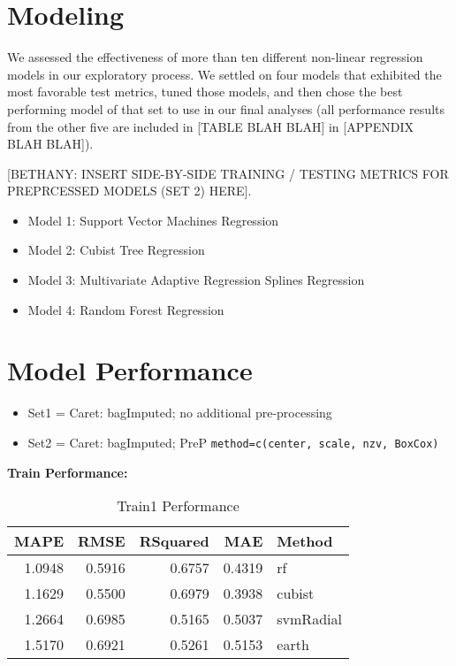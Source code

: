\documentclass[]{report}
\providecommand{\tightlist}{%
  \setlength{\itemsep}{0pt}\setlength{\parskip}{0pt}}
\begin{document}
\hypertarget{modeling}{%
\chapter{Modeling}\label{modeling}}

We assessed the effectiveness of more than ten different non-linear
regression models in our exploratory process. We settled on four models
that exhibited the most favorable test metrics, tuned those models, and
then chose the best performing model of that set to use in our final
analyses (all performance results from the other five are included in
{[}TABLE BLAH BLAH{]} in {[}APPENDIX BLAH BLAH{]}).

{[}BETHANY: INSERT SIDE-BY-SIDE TRAINING / TESTING METRICS FOR
PREPRCESSED MODELS (SET 2) HERE{]}.

\begin{itemize}
\tightlist
\item
  Model 1: Support Vector Machines Regression
\item
  Model 2: Cubist Tree Regression
\item
  Model 3: Multivariate Adaptive Regression Splines Regression
\item
  Model 4: Random Forest Regression
\end{itemize}

\hypertarget{model-performance}{%
\chapter{Model Performance}\label{model-performance}}

\begin{itemize}
\tightlist
\item
  Set1 = Caret: bagImputed; no additional pre-processing\\
\item
  Set2 = Caret: bagImputed; PreP
  \texttt{method=c(\textquotesingle{}center\textquotesingle{},\ \textquotesingle{}scale\textquotesingle{},\ \textquotesingle{}nzv\textquotesingle{},\ \textquotesingle{}BoxCox\textquotesingle{})}
\end{itemize}

\textbf{Train Performance:}

\begin{table}[H]

\caption{\label{tab:unnamed-chunk-7}Train1 Performance}
\centering
\fontsize{8}{10}\selectfont
\begin{tabular}{rrrrl}
\toprule
MAPE & RMSE & RSquared & MAE & Method\\
\midrule
\rowcolor{gray!6}  1.0948 & 0.5916 & 0.6757 & 0.4319 & rf\\
1.1629 & 0.5500 & 0.6979 & 0.3938 & cubist\\
\rowcolor{gray!6}  1.2664 & 0.6985 & 0.5165 & 0.5037 & svmRadial\\
1.5170 & 0.6921 & 0.5261 & 0.5153 & earth\\
\bottomrule
\end{tabular}
\end{table}
\end{document}
